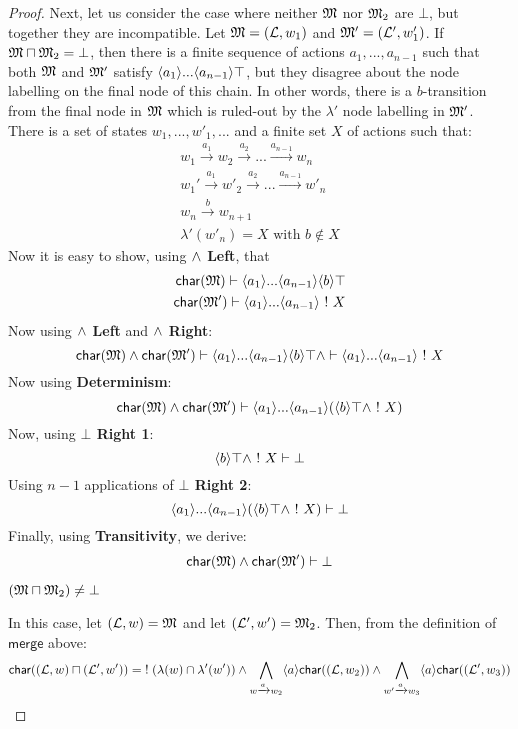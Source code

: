 \begin{proof}
Next, let us consider the case where neither $\frak{M}$ nor $\frak{M}_2$ are $\bot$, but together they are incompatible.
Let $\frak{M} = (\mathcal{L}, w_1)$ and $\frak{M}' = (\mathcal{L}', w'_1)$.
If $\frak{M} \sqcap \frak{M}_2 = \bot$, then there is a finite sequence of actions $a_1, ..., a_{n-1}$ such that both $\frak{M}$ and $\frak{M}'$ satisfy $\langle a_1 \rangle ... \langle a_{n-1} \rangle \top$, but they disagree about the node labelling on the final node of this chain. In other words, there is a $b$-transition from the final node in $\frak{M}$ which is ruled-out by the $\lambda'$ node labelling in $\frak{M}'$. There is a set of states $w_1, ..., w'_1, ...$ and a finite set $X$ of actions such that:
\begin{eqnarray*}
w_1 \xrightarrow{a_1} w_2 \xrightarrow{a_2} ... \xrightarrow{a_{n-1}} w_n \\
w_1' \xrightarrow{a_1} w'_2 \xrightarrow{a_2} ... \xrightarrow{a_{n-1}} w'_n \\
w_n \xrightarrow{b} w_{n+1} \\
\lambda'(w'_n) = X \text{ with } b \notin X
\end{eqnarray*}
Now it is easy to show, using {\bf $\land$ Left}, that
\begin{eqnarray*}
\mathsf{char}(\mathsf{\frak{M}}) \vdash \langle a_1 \rangle ... \langle a_{n-1} \rangle \langle b \rangle \top \\
\mathsf{char}(\mathsf{\frak{M}'}) \vdash \langle a_1 \rangle ... \langle a_{n-1} \rangle \ ! \  X
\end{eqnarray*}
Now using {\bf $\land$ Left} and {\bf $\land$ Right}:
\[
\mathsf{char}(\mathsf{\frak{M}}) \land \mathsf{char}(\mathsf{\frak{M}}') \vdash  \langle a_1 \rangle ... \langle a_{n-1} \rangle \langle b \rangle \top \land  \vdash \langle a_1 \rangle ... \langle a_{n-1} \rangle \ ! \  X
\]
Now using {\bf Determinism}:
\[
\mathsf{char}(\mathsf{\frak{M}}) \land \mathsf{char}(\mathsf{\frak{M}}') \vdash  \langle a_1 \rangle ... \langle a_{n-1} \rangle (\langle b \rangle \top \land \ ! \  X)
\]
Now, using {\bf $\bot$ Right 1}:
\[
\langle b \rangle \top \land \ ! \  X \vdash \bot
\]
Using $n-1$ applications of  {\bf $\bot$ Right 2}:
\[
\langle a_1 \rangle ... \langle a_{n-1} \rangle (\langle b \rangle \top \land \ ! \  X) \vdash \bot
\]
Finally, using {\bf Transitivity}, we derive:
\[
\mathsf{char}(\mathsf{\frak{M}}) \land \mathsf{char}(\mathsf{\frak{M}}') \vdash \bot
\]
\begin{mycase}
$(\frak{M} \sqcap \frak{M}_2) \neq \bot$
\end{mycase}
In this case, let $(\mathcal{L},w) = \frak{M}$ and let $(\mathcal{L}',w')=\frak{M}_2$.
Then, from the definition of $\mathsf{merge}$ above:
\[
 \mathsf{char}((\mathcal{L},w) \sqcap (\mathcal{L}',w')) = \; ! \; (\lambda(w) \cap \lambda'(w')) \land \bigwedge_{w \xrightarrow{a} w_2} \langle a \rangle  \mathsf{char}((\mathcal{L}, w_2)) \land \bigwedge_{w' \xrightarrow{a} w_3} \langle a \rangle  \mathsf{char}((\mathcal{L}', w_3))
\]
\end{proof}
